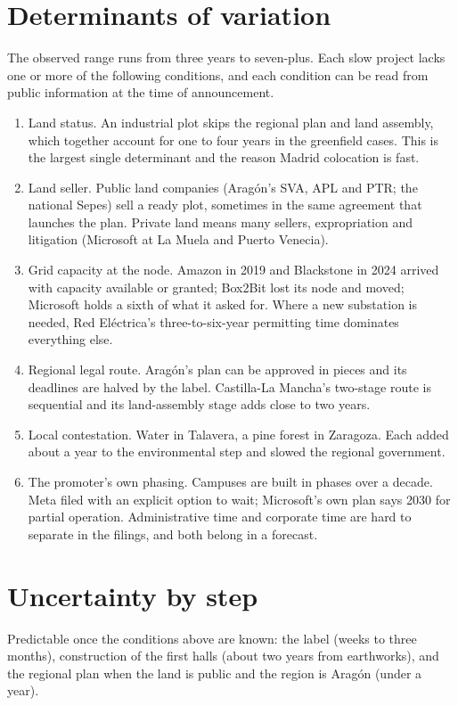 \documentclass[11pt]{article}
\begin{document}
\section{Determinants of variation}

The observed range runs from three years to seven-plus. Each slow project lacks one or more of the following conditions, and each condition can be read from public information at the time of announcement.

\begin{enumerate}[leftmargin=*]
\item Land status. An industrial plot skips the regional plan and land assembly, which together account for one to four years in the greenfield cases. This is the largest single determinant and the reason Madrid colocation is fast.
\item Land seller. Public land companies (Aragón's SVA, APL and PTR; the national Sepes) sell a ready plot, sometimes in the same agreement that launches the plan. Private land means many sellers, expropriation and litigation (Microsoft at La Muela and Puerto Venecia).
\item Grid capacity at the node. Amazon in 2019 and Blackstone in 2024 arrived with capacity available or granted; Box2Bit lost its node and moved; Microsoft holds a sixth of what it asked for. Where a new substation is needed, Red Eléctrica's three-to-six-year permitting time dominates everything else.
\item Regional legal route. Aragón's plan can be approved in pieces and its deadlines are halved by the label. Castilla-La Mancha's two-stage route is sequential and its land-assembly stage adds close to two years.
\item Local contestation. Water in Talavera, a pine forest in Zaragoza. Each added about a year to the environmental step and slowed the regional government.
\item The promoter's own phasing. Campuses are built in phases over a decade. Meta filed with an explicit option to wait; Microsoft's own plan says 2030 for partial operation. Administrative time and corporate time are hard to separate in the filings, and both belong in a forecast.
\end{enumerate}

\section{Uncertainty by step}

Predictable once the conditions above are known: the label (weeks to three months), construction of the first halls (about two years from earthworks), and the regional plan when the land is public and the region is Aragón (under a year).
\end{document}
